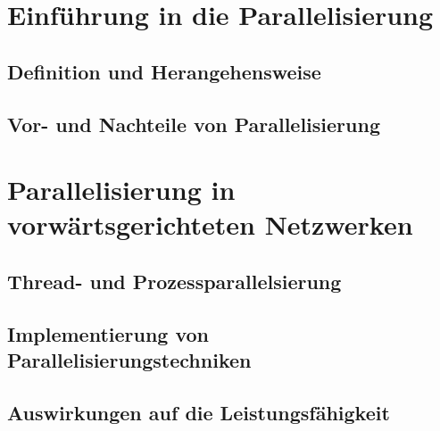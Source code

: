 \section{Einführung in die Parallelisierung}
\label{sec:Grundlagen_neuronale_Netzwerke}
\subsection{Definition und Herangehensweise}
\label{sec:Grundlagen_neuronale_Netzwerke_Aufbau}
\subsection{Vor- und Nachteile von Parallelisierung}
\label{sec:Grundlagen_neuronale_Netzwerke_Aufbau}

\section{Parallelisierung in vorwärtsgerichteten Netzwerken}
\label{sec:Grundlagen_neuronale_Netzwerke}
\subsection{Thread- und Prozessparallelsierung}
\label{sec:Grundlagen_neuronale_Netzwerke_Aufbau}
\subsection{Implementierung von Parallelisierungstechniken}
\label{sec:Grundlagen_neuronale_Netzwerke_Aufbau}
\subsection{Auswirkungen auf die Leistungsfähigkeit}
\label{sec:Grundlagen_neuronale_Netzwerke_Aufbau}